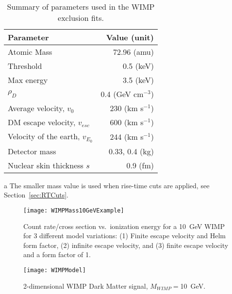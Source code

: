 		\begin{table}
			\centering
			\caption{Summary of parameters used in the WIMP exclusion fits.}
			\label{tab:BeGeFitParameters}
			\smallskip
			\begin{threeparttable}
				\begin{tabular}{l|r}
					Parameter & Value (unit) \\
					\hline
					\hline
					Atomic Mass & 72.96 (amu) \\
					Threshold & 0.5 (keV) \\
					Max energy & 3.5 (keV) \\
					$\rho_{D}$  &  0.4 (GeV cm$^{-3}$) \\
					Average velocity, $v_{0}$ & 230 (km s$^{-1}$) \\
					DM escape velocity, $v_{esc}$ & 600 (km s$^{-1}$) \\
					Velocity of the earth, $v_{E_{0}}$ & 244 (km s$^{-1}$) \\
					Detector mass &  0.33, 0.4\tnote{a} (kg) \\
					Nuclear skin thickness $s$ & 0.9 (fm) \\
					\hline
					\hline
				\end{tabular}	
				 \begin{tablenotes}
				       \item[a] {The smaller mass value is used when rise-time cuts are applied, see 
				       Section~\ref{sec:RTCuts}.}
			     	\end{tablenotes}
			\end{threeparttable}
		\end{table}
		\begin{figure}
			\centering
			\texttt{[image: WIMPMass10GeVExample]}
			\caption{Count rate/cross section vs.~ionization energy for a 10~GeV WIMP for 3 different model 
			variations: (1) Finite escape velocity and Helm form factor, (2) infinite escape velocity, 
			and (3) finite escape velocity and a form factor of 1.}
			\label{fig:1DDMSignal}
		\end{figure}
		
		\begin{figure}
			\centering
			\texttt{[image: WIMPModel]}
			\caption{2-dimensional WIMP Dark Matter signal, $M_{WIMP} = $10~GeV.}
			\label{fig:2DDMSignal}
		\end{figure}


